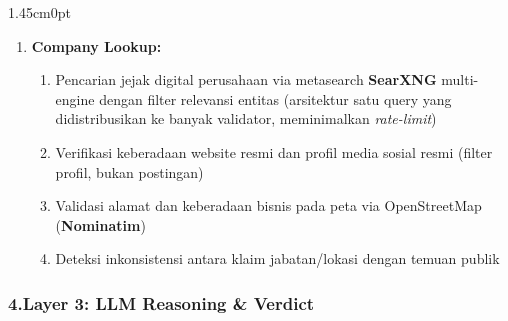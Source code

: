 \documentclass[12pt,a4paper]{article}
\begin{document}
\begin{adjustwidth}{1.45cm}{0pt}
\begin{enumerate}[label=\textbf{\alph*.}, labelindent=0pt, leftmargin=*]
\item \textbf{Company Lookup:}
\begin{enumerate}[label=\textbf{\arabic*)}, leftmargin=0.50cm]
\item Pencarian jejak digital perusahaan via metasearch \textbf{SearXNG} multi-engine dengan filter relevansi entitas (arsitektur satu query yang didistribusikan ke banyak validator, meminimalkan \textit{rate-limit})
\item Verifikasi keberadaan website resmi dan profil media sosial resmi (filter profil, bukan postingan)
\item Validasi alamat dan keberadaan bisnis pada peta via OpenStreetMap (\textbf{Nominatim})
\item Deteksi inkonsistensi antara klaim jabatan/lokasi dengan temuan publik
\end{enumerate}
\end{enumerate}
\end{adjustwidth}

\subsubsection*{4.\quad Layer 3: LLM Reasoning \& Verdict}
\end{document}
